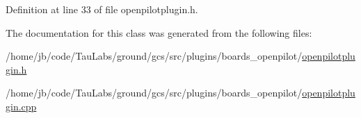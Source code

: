 \-Definition at line 33 of file openpilotplugin.\-h.



\-The documentation for this class was generated from the following files\-:\begin{DoxyCompactItemize}
\item 
/home/jb/code/\-Tau\-Labs/ground/gcs/src/plugins/boards\-\_\-openpilot/\hyperlink{openpilotplugin_8h}{openpilotplugin.\-h}\item 
/home/jb/code/\-Tau\-Labs/ground/gcs/src/plugins/boards\-\_\-openpilot/\hyperlink{openpilotplugin_8cpp}{openpilotplugin.\-cpp}\end{DoxyCompactItemize}
